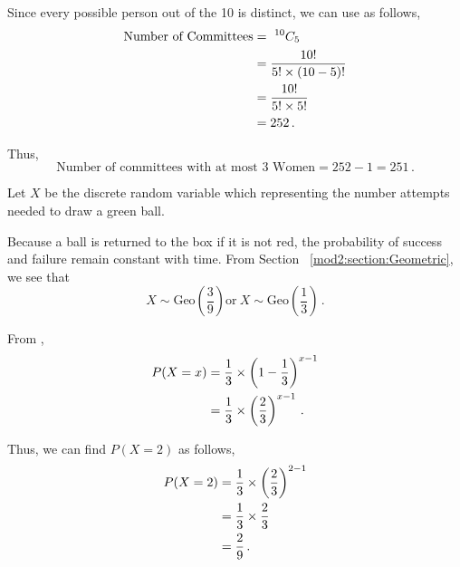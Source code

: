 \begin{subquestions}
Since every possible person out of the 10 is distinct, we can use  as follows,
\begin{align}
	\text{Number of Committees} & = ~ ^{10}C_5 \nonumber \\
	                            & = \frac{10!}{5!\times (10-5)!} \nonumber \\
	                            & = \frac{10!}{5! \times 5!} \nonumber \\
	                            & = 252 \,.
\end{align}

Thus,
\begin{equation}
	\text{Number of committees with at most 3 Women} = 252 - 1 = 251 \,.
\end{equation}


\subquestion

Let $X$ be the discrete random variable which representing the number attempts needed to draw a green ball.

\begin{subsubquestions}
	
\subsubquestion
Because a ball is returned to the box if it is not red, the probability of success and failure remain constant with time. From Section ~\ref{mod2:section:Geometric}, we see that
\begin{equation}
	X \sim \text{Geo} \left(\frac{3}{9}\right) \text{or} ~ X \sim \text{Geo} \left(\frac{1}{3}\right) \,.
\end{equation}


\subsubquestion

\begin{subsubsubquestions}
	
\subsubsubquestion

From ,
\begin{align}
	P(X = x) & = \frac{1}{3} \times \left(1-\frac{1}{3} \right)^{x-1} \nonumber \\
				& = \frac{1}{3} \times \left(\frac{2}{3} \right)^{x-1} \,.
\end{align}	
	
Thus, we can find $P(X=2)$ as follows,
\begin{align}
	P(X=2) & = \frac{1}{3} \times \left(\frac{2}{3} \right)^{2-1} \nonumber \\
	       & = \frac{1}{3} \times \frac{2}{3}  \nonumber \\
	       & = \frac{2}{9} \,.
\end{align}


\end{subsubsubquestions}
\end{subsubquestions}
\end{subquestions}
